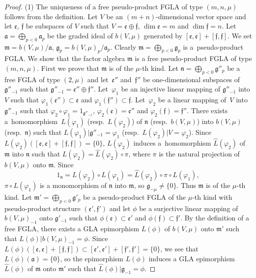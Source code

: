 \documentclass[11pt]{article}
\numberwithin{equation}{section}
\numberwithin{theorem}{section}
\numberwithin{proposition}{section}
\numberwithin{lemma}{section}
\numberwithin{corollary}{section}
\numberwithin{definition}{section}
\numberwithin{example}{section}
\numberwithin{remark}{section}
\numberwithin{note}{section}
\begin{document}
\begin{proof} (1)
The uniqueness of a free pseudo-product FGLA of type $(m,n,\mu)$ follows from the def\/inition.
Let $V$ be an $(m+n)$-dimensional vector space and let
$\mathfrak e$, $\mathfrak f$ be subspaces of $V$
such that $V=\mathfrak e\oplus \mathfrak f$,
$\dim \mathfrak e=m$ and $\dim \mathfrak f=n$.
Let $\mathfrak a=\bigoplus\limits_{p<0}\mathfrak a_p$ be the graded ideal
of $b(V,\mu)$ generated by
$[\mathfrak e,\mathfrak e]+[\mathfrak f,\mathfrak f]$.
We set $\mathfrak m=b(V,\mu)/\mathfrak a$,
$\mathfrak g_p=b(V,\mu)_p/\mathfrak a_p$.
Clearly $\mathfrak m=\bigoplus\limits_{p<0}\mathfrak g_p$ is
a~pseudo-product FGLA.
We show that the factor algebra $\mathfrak m$
is a free pseudo-product FGLA of type $(m,n,\mu)$.
First we prove that $\mathfrak m$ is of the $\mu$-th kind.
Let $\mathfrak n=\bigoplus\limits_{p<0}\mathfrak g''_p$ be
a free FGLA of type $(2,\mu)$ and let~$\mathfrak e''$ and~$\mathfrak f''$
be one-dimensional subspaces of $\mathfrak g''_{-1}$ such that
$\mathfrak g''_{-1}=\mathfrak e''\oplus\mathfrak f''$.
Let~$\varphi_1$ be an injective linear mapping of $\mathfrak g''_{-1}$
into $V$ such that
$\varphi_1(\mathfrak e'')\subset \mathfrak e$ and
$\varphi_1(\mathfrak f'')\subset \mathfrak f$.
Let~$\varphi_2$ be a linear mapping of~$V$
into $\mathfrak g''_{-1}$ such that
$\varphi_2\circ\varphi_1=1_{\mathfrak g''_{-1}}$,
$\varphi_2(\mathfrak e)=\mathfrak e''$ and
$\varphi_2(\mathfrak f)=\mathfrak f''$.
There exists
a~homomorphism~$L(\varphi_1)$ (resp.~$L(\varphi_2)$) of
$\mathfrak n$ (resp.~$b(V,\mu)$) into
$b(V,\mu)$ (resp.~$\mathfrak n$)
such that
$L(\varphi_1)|\mathfrak g''_{-1}=\varphi_1$
(resp.\ $L(\varphi_2)|V=\varphi_2$).
Since $L(\varphi_2)([\mathfrak e,\mathfrak e]+[\mathfrak f,\mathfrak f])=\{0\}$,
$L(\varphi_2)$ induces a~homomorphism $\hat{L}(\varphi_2)$ of
$\mathfrak m$ into $\mathfrak n$ such that
$L(\varphi_2)=\hat{L}(\varphi_2)\circ \pi$,
where $\pi$ is the natural projection of $b(V,\mu)$ onto
$\mathfrak m$. Since
\[
1_{\mathfrak n}=L(\varphi_2)\circ L(\varphi_1)
=\hat{L}(\varphi_2)\circ \pi\circ L(\varphi_1),
\]
$\pi\circ L(\varphi_1)$ is a monomorphism of $\mathfrak n$ into $\mathfrak m$, so $\mathfrak g_{-\mu}\ne\{0\}$.
Thus $\mathfrak m$ is of the $\mu$-th kind.
Let $\mathfrak m'=\bigoplus\limits_{p<0}\mathfrak g'_p$ be a pseudo-product
FGLA of the $\mu$-th kind
with pseudo-product structure $(\mathfrak e',\mathfrak f')$
and let $\phi$ be a surjective linear mapping of $b(V,\mu)_{-1}$ onto
$\mathfrak g'_{-1}$ such that
$\phi(\mathfrak e)\subset\mathfrak e'$ and
$\phi(\mathfrak f)\subset\mathfrak f'$.
By the def\/inition of a free FGLA,
there exists a GLA epimorphism $L(\phi)$ of
$b(V,\mu)$ onto $\mathfrak m'$ such that
$L(\phi)|b(V,\mu)_{-1}=\phi$.
Since $L(\phi)([\mathfrak e,\mathfrak e]+[\mathfrak f,\mathfrak f])\subset [\mathfrak e',\mathfrak e']+[\mathfrak f',\mathfrak f']=\{0\}$,
we see that $L(\phi)(\mathfrak a)=\{0\}$, so
the epimorphism $L(\phi)$ induces a GLA epimorphism
$\hat{L}(\phi)$ of $\mathfrak m$ onto $\mathfrak m'$ such that
$\hat{L}(\phi)|\mathfrak g_{-1}=\phi$.


\end{proof}
\end{document}
